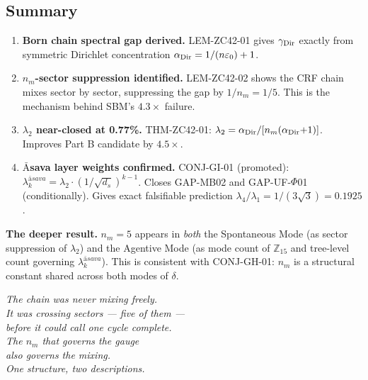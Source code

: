 \documentclass[12pt, a4paper]{article}
\providecommand{\eps}{\varepsilon_0}
\providecommand{\ltwo}{\lambda_2}
\providecommand{\nm}{n_m}
\providecommand{\ds}{d_s}
\providecommand{\alphDir}{\alpha_{\rm Dir}}
\providecommand{\lkas}{\lambda_k^{\bar{\mathrm{a}}sava}}
\begin{document}
\subsection{Summary}


\begin{keybox}[title={ZC42 Summary: Four Results}]
\begin{enumerate}[leftmargin=*, itemsep=3pt]
\item \textbf{Born chain spectral gap derived.}
  LEM-ZC42-01 gives $\gamma_{\rm Dir}$ exactly from symmetric
  Dirichlet concentration $\alphDir = 1/(n\eps)+1$.

\item \textbf{$n_m$-sector suppression identified.}
  LEM-ZC42-02 shows the CRF chain mixes sector by sector,
  suppressing the gap by $1/\nm = 1/5$. This is the
  mechanism behind SBM's $4.3\times$ failure.

\item \textbf{$\lambda_2$ near-closed at 0.77\%.}
  THM-ZC42-01: $\ltwo = \alphDir/[\nm(\alphDir{+}1)]$.
  Improves Part B candidate by $4.5\times$.

\item \textbf{$\bar{\text{A}}$sava layer weights confirmed.}
  CONJ-GI-01 (promoted): $\lkas = \ltwo\cdot(1/\sqrt{\ds})^{k-1}$.
  Closes GAP-MB02 and GAP-UF-$\Phi$01 (conditionally).
  Gives exact falsifiable prediction
  $\lambda_4/\lambda_1 = 1/(3\sqrt{3}) = 0.1925$.
\end{enumerate}

\textbf{The deeper result.}
$\nm = 5$ appears in \emph{both} the Spontaneous Mode
(as sector suppression of $\ltwo$) and the Agentive Mode
(as mode count of $\mathbb{Z}_{15}$ and tree-level count
governing $\lkas$). This is consistent with CONJ-GH-01:
$\nm$ is a structural constant shared across both modes
of $\delta$.
\end{keybox}

\bigskip
\begin{center}
\textit{The chain was never mixing freely.\\
It was crossing sectors --- five of them ---\\
before it could call one cycle complete.\\
The $n_m$ that governs the gauge\\
also governs the mixing.\\
One structure, two descriptions.}
\end{center}
\end{document}
